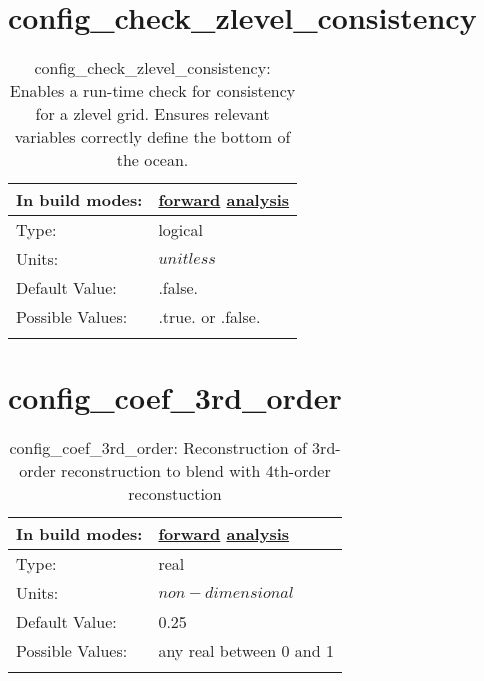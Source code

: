 \section[config\_check\_zlevel\_consistency]{config\_check\_zlevel\_consistency}
\label{sec:nm_sec_config_check_zlevel_consistency}
\begin{center}
\begin{longtable}{| p{2.0in} || p{4.0in} |}
    \hline
    In build modes: & \hyperref[subsec:forward_nm_tab_debug]{forward} \hyperref[subsec:analysis_nm_tab_debug]{analysis} \\
    \hline
    Type: & logical \\
    \hline
    Units: & $unitless$ \\
    \hline
    Default Value: & .false. \\
    \hline
    Possible Values: & .true. or .false. \\
    \hline
    \caption{config\_check\_zlevel\_consistency: Enables a run-time check for consistency for a zlevel grid. Ensures relevant variables correctly define the bottom of the ocean.}
\end{longtable}
\end{center}
\section[config\_coef\_3rd\_order]{config\_coef\_3rd\_order}
\label{sec:nm_sec_config_coef_3rd_order}
\begin{center}
\begin{longtable}{| p{2.0in} || p{4.0in} |}
    \hline
    In build modes: & \hyperref[subsec:forward_nm_tab_advection]{forward} \hyperref[subsec:analysis_nm_tab_advection]{analysis} \\
    \hline
    Type: & real \\
    \hline
    Units: & $non-dimensional$ \\
    \hline
    Default Value: & 0.25 \\
    \hline
    Possible Values: & any real between 0 and 1 \\
    \hline
    \caption{config\_coef\_3rd\_order: Reconstruction of 3rd-order reconstruction to blend with 4th-order reconstuction}
\end{longtable}
\end{center}
